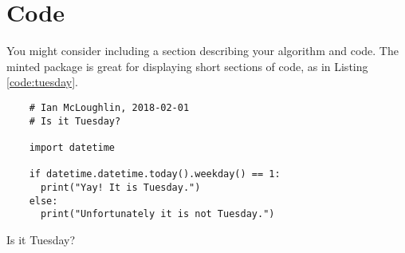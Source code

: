 \section{Code}


You might consider including a section describing your algorithm and code.
The minted package is great for displaying short sections of code, as in 
Listing \ref{code:tuesday}.



\begin{listing}[H]
  \begin{verbatim}
    # Ian McLoughlin, 2018-02-01
    # Is it Tuesday?

    import datetime

    if datetime.datetime.today().weekday() == 1:
      print("Yay! It is Tuesday.")
    else:
      print("Unfortunately it is not Tuesday.")
  \end{verbatim}
  \caption{Is it Tuesday?}
  \label{code:tuesday}
\end{listing}

\lipsum[10-15]